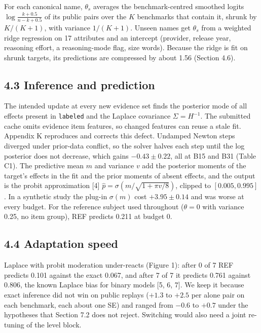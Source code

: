 \documentclass[
]{article}
\begin{document}
For each canonical name, \(\theta_s\) averages the benchmark-centred
smoothed logits \(\log\frac{k + 0.5}{n - k + 0.5}\) of its public pairs
over the \(K\) benchmarks that contain it, shrunk by \(K/(K+1)\), with
variance \(1/(K+1)\). Unseen names get \(\theta_s\) from a weighted
ridge regression on 17 attributes and an intercept (provider, release
year, reasoning effort, a reasoning-mode flag, size words). Because the
ridge is fit on shrunk targets, its predictions are compressed by about
1.56 (Section 4.6).

\subsection{4.3 Inference and
prediction}\label{inference-and-prediction}

The intended update at every new evidence set finds the posterior mode
of all effects present in \texttt{labeled} and the Laplace covariance
\(\Sigma = H^{-1}\). The submitted cache omits evidence item features,
so changed features can reuse a stale fit. Appendix K reproduces and
corrects this defect. Undamped Newton steps diverged under prior-data
conflict, so the solver halves each step until the log posterior does
not decrease, which gains \(-0.43 \pm 0.22\), all at B15 and B31 (Table
C1). The predictive mean \(m\) and variance \(v\) add the posterior
moments of the target's effects in the fit and the prior moments of
absent effects, and the output is the probit approximation {[}4{]}
\(\hat p = \sigma(m / \sqrt{1 + \pi v/8})\), clipped to \([0.005,
0.995]\). In a synthetic study the plug-in \(\sigma(m)\) cost
\(+3.95 \pm 0.14\) and was worse at every budget. For the reference
subject used throughout (\(\theta = 0\) with variance 0.25, no item
group), REF predicts 0.211 at budget 0.

\subsection{4.4 Adaptation speed}\label{adaptation-speed}

Laplace with probit moderation under-reacts (Figure 1): after 0 of 7 REF
predicts 0.101 against the exact 0.067, and after 7 of 7 it predicts
0.761 against 0.806, the known Laplace bias for binary models {[}5, 6,
7{]}. We keep it because exact inference did not win on public replays
(\(+1.3\) to \(+2.5\) per alone pair on each benchmark, each about one
SE) and ranged from \(-0.6\) to \(+0.7\) under the hypotheses that
Section 7.2 does not reject. Switching would also need a joint re-tuning
of the level block.
\end{document}
